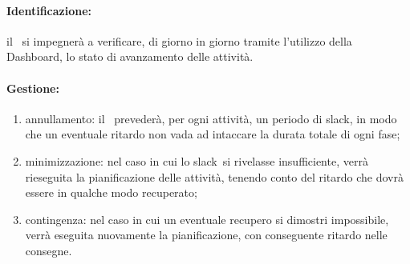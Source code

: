 \documentclass[../PianoProgetto.tex]{subfiles}
\begin{document}
	\paragraph*{Identificazione:} il \responsabilediprogetto\ si impegnerà a verificare, di giorno in giorno tramite l'utilizzo della Dashboard\g, lo stato di avanzamento delle attività.
	
	\paragraph*{Gestione:}
	\begin{enumerate}
		\item annullamento: il \responsabilediprogetto\ prevederà, per ogni attività, un periodo di slack\g, in modo che un eventuale ritardo non vada ad intaccare la durata totale di ogni fase\g ;
		\item minimizzazione: nel caso in cui lo slack\g\ si rivelasse insufficiente, verrà rieseguita la pianificazione delle attività, tenendo conto del ritardo che dovrà essere in qualche modo recuperato;
		\item contingenza: nel caso in cui un eventuale recupero si dimostri impossibile, verrà eseguita nuovamente la pianificazione, con conseguente ritardo nelle consegne.
	\end{enumerate}	
	
	
\end{document}
